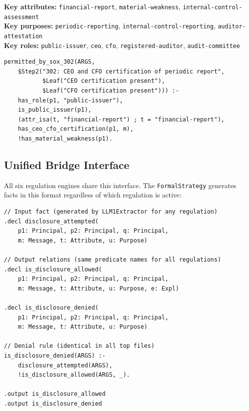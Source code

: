 \documentclass[11pt,letterpaper]{article}
\begin{document}
\begin{appendices}
\textbf{Key attributes:} \texttt{financial-report}, \texttt{material-weakness}, \texttt{internal-control-assessment}\\
\textbf{Key purposes:} \texttt{periodic-reporting}, \texttt{internal-control-reporting}, \texttt{auditor-attestation}\\
\textbf{Key roles:} \texttt{public-issuer}, \texttt{ceo}, \texttt{cfo}, \texttt{registered-auditor}, \texttt{audit-committee}

\begin{lstlisting}[style=soufflestyle,caption={SOX \S 302 dual-certification rule}]
permitted_by_sox_302(ARGS,
    $Step2("302: CEO and CFO certification of periodic report",
           $Leaf("CEO certification present"),
           $Leaf("CFO certification present"))) :-
    has_role(p1, "public-issuer"),
    is_public_issuer(p1),
    (attr_isa(t, "financial-report") ; t = "financial-report"),
    has_ceo_cfo_certification(p1, m),
    !has_material_weakness(p1).
\end{lstlisting}

\subsection{Unified Bridge Interface}

All six regulation engines share this interface. The \texttt{FormalStrategy} generates facts in this format regardless of which regulation is active:

\begin{lstlisting}[style=soufflestyle,caption={Bridge interface --- identical across all 6 regulation engines}]
// Input fact (generated by LLM1Extractor for any regulation)
.decl disclosure_attempted(
    p1: Principal, p2: Principal, q: Principal,
    m: Message, t: Attribute, u: Purpose)

// Output relations (same predicate names for all regulations)
.decl is_disclosure_allowed(
    p1: Principal, p2: Principal, q: Principal,
    m: Message, t: Attribute, u: Purpose, e: Expl)

.decl is_disclosure_denied(
    p1: Principal, p2: Principal, q: Principal,
    m: Message, t: Attribute, u: Purpose)

// Denial rule (identical in all top files)
is_disclosure_denied(ARGS) :-
    disclosure_attempted(ARGS),
    !is_disclosure_allowed(ARGS, _).

.output is_disclosure_allowed
.output is_disclosure_denied
\end{lstlisting}



\end{appendices}
\end{document}
